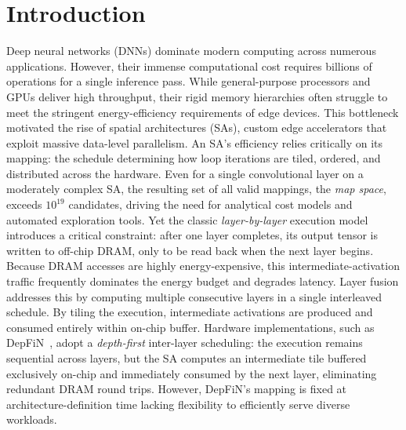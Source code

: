 \documentclass[11pt,a4paper,twocolumn]{article}
\begin{document}



\label{ch:executive-summary}

\section*{Introduction}
Deep neural networks (DNNs) dominate modern computing across numerous applications. However, their immense computational cost requires billions of operations for a single inference pass.
While general-purpose processors and GPUs deliver high throughput,
their rigid memory hierarchies often struggle to meet the stringent
energy-efficiency requirements of edge devices.
This bottleneck motivated the rise of spatial architectures (SAs), custom edge accelerators that exploit massive data-level parallelism. An SA's efficiency relies critically on its mapping: the schedule determining how loop iterations are tiled, ordered, and distributed across the hardware.
Even for a single convolutional layer on a moderately complex SA, the
resulting set of all valid mappings, the \emph{map space}, exceeds $10^{19}$ candidates, driving the need for analytical cost models and automated exploration tools.
Yet the classic \emph{layer-by-layer} execution model
introduces a critical constraint: after one layer completes, its
output tensor is written to off-chip DRAM, only to be read
back when the next layer begins.
Because DRAM accesses are highly energy-expensive, this intermediate-activation traffic frequently dominates the energy budget and degrades latency. Layer fusion addresses this by computing multiple consecutive layers in a single interleaved schedule.
By tiling the execution, intermediate activations are produced and consumed entirely within on-chip buffer. Hardware implementations, such as DepFiN~\cite{goetschalckx2023depfin}, adopt a \emph{depth-first}
inter-layer scheduling: the execution remains sequential across layers,
but the SA computes an intermediate tile buffered exclusively
on-chip and immediately consumed by the next layer, eliminating redundant DRAM round trips. However, DepFiN's mapping is fixed at
architecture-definition time lacking flexibility to
efficiently serve diverse workloads.
\end{document}
